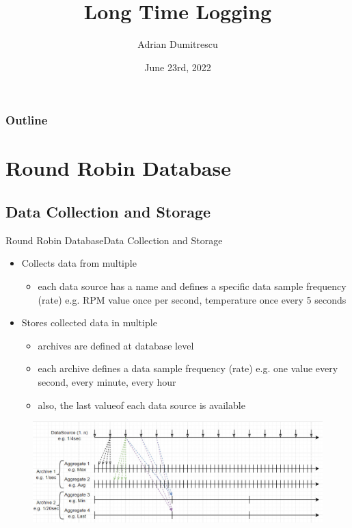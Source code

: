 \documentclass[t, 9pt, aspectratio=169]{beamer}
\title{Long Time Logging}
\subtitle{}
\author{Adrian Dumitrescu}
\institute{ThermoFisher Scientific}
\date{June 23rd, 2022}
\begin{document}
    \begin{frame}
        \titlepage
    \end{frame}

    \begin{frame}
        \frametitle{Outline}
        \tableofcontents
    \end{frame}

    \section{Round Robin Database}
    \subsection{Data Collection and Storage}

    \begin{frame}{Round Robin Database}{Data Collection and Storage}
        \begin{itemize}
            \item Collects data from multiple 
            \begin{itemize}
                \item each data source has a name and defines a specific data sample frequency (rate) e.g. RPM value once per second, temperature once every 5 seconds
            \end{itemize}
            \item Stores collected data in multiple 
            \begin{itemize}
                \item archives are defined at database level
                \item each archive defines a data sample frequency (rate) e.g. one value every second, every minute, every hour
                \item also, the last value\footnotemark of each data source is available
            \end{itemize}
        \end{itemize}
        \begin{figure}
            \includegraphics[scale=0.35]{rrdb-structure.jpg}
        \end{figure}
    \end{frame}
\end{document}
